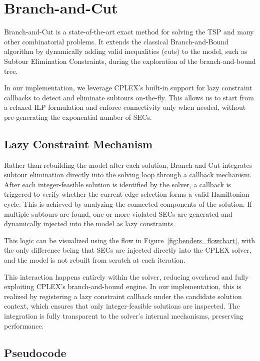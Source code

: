 \section{Branch-and-Cut}

Branch-and-Cut is a state-of-the-art exact method for solving the TSP and many other combinatorial problems. It extends the classical Branch-and-Bound algorithm by dynamically adding valid inequalities (cuts) to the model, such as Subtour Elimination Constraints, during the exploration of the branch-and-bound tree.

In our implementation, we leverage CPLEX’s built-in support for lazy constraint callbacks to detect and eliminate subtours on-the-fly. This allows us to start from a relaxed ILP formulation and enforce connectivity only when needed, without pre-generating the exponential number of SECs.

\subsection{Lazy Constraint Mechanism}

Rather than rebuilding the model after each solution, Branch-and-Cut integrates subtour elimination directly into the solving loop through a callback mechanism. After each integer-feasible solution is identified by the solver, a callback is triggered to verify whether the current edge selection forms a valid Hamiltonian cycle. This is achieved by analyzing the connected components of the solution. If multiple subtours are found, one or more violated SECs are generated and dynamically injected into the model as lazy constraints.

This logic can be visualized using the flow in Figure~\ref{fig:benders_flowchart}, with the only difference being that SECs are injected directly into the CPLEX solver, and the model is not rebuilt from scratch at each iteration.

This interaction happens entirely within the solver, reducing overhead and fully exploiting CPLEX’s branch-and-bound engine. In our implementation, this is realized by registering a lazy constraint callback under the candidate solution context, which ensures that only integer-feasible solutions are inspected. The integration is fully transparent to the solver's internal mechanisms, preserving performance.

\subsection{Pseudocode}

